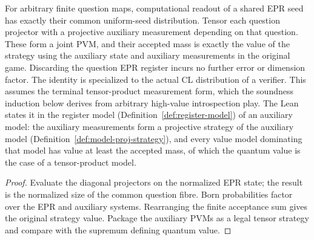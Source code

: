 \begin{lemma}
\label{lem:intro-final-extraction}
\leanok
For arbitrary finite question maps, computational readout of a shared EPR seed
has exactly their common uniform-seed distribution. Tensor each question
projector with a projective auxiliary measurement depending on that question.
These form a joint PVM, and their accepted mass is exactly the value of the
strategy using the auxiliary state and auxiliary measurements in the original
game. Discarding the question EPR register incurs no further error or dimension
factor. The identity is specialized to the actual CL distribution of a verifier.
This assumes the terminal tensor-product measurement form, which the soundness
induction below derives from arbitrary high-value introspection play.
The Lean states it in the register model (Definition~\ref{def:register-model}) of an auxiliary
model: the auxiliary measurements form a projective strategy of the auxiliary model
(Definition~\ref{def:model-proj-strategy}), and every value model dominating that model has value
at least the accepted mass, of which the quantum value is the case of a tensor-product model.
\end{lemma}
\begin{proof}
\leanok
Evaluate the diagonal projectors on the normalized EPR state; the result is the
normalized size of the common question fibre. Born probabilities factor over
the EPR and auxiliary systems. Rearranging the finite acceptance sum gives
the original strategy value. Package the auxiliary PVMs as a legal tensor
strategy and compare with the supremum defining quantum value.
\end{proof}

